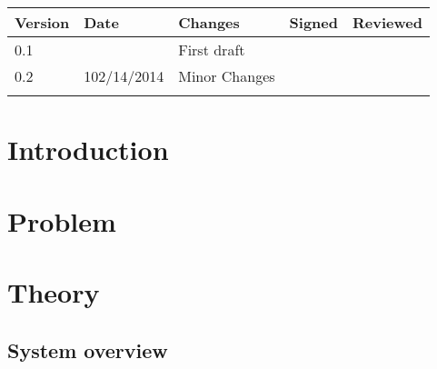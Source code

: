 \documentclass[12p]{article}
\begin{document}

\begin{table}[h]
\centering
\begin{tabular}{|l|l|l|l|l|}
\hline
\textbf{Version} & \textbf{Date} & \textbf{Changes} & \textbf{Signed} & \textbf{Reviewed} \\ \hline
0.1              &               & First draft      &                 &                   \\ \hline
0.2                 & 102/14/2014              &   Minor Changes               &                 &                   \\ \hline
                 &               &                  &                 &                   \\ \hline
\end{tabular}
\end{table}
\newpage


\section{Introduction}


\newpage
\section{Problem}
\label{Problem}

\section{Theory}
\label{Theory}


\subsection{System overview}
\label{Theory:SystemOverview}
\end{document}
